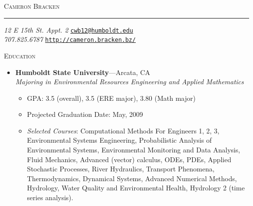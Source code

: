 \documentclass[11pt,oneside]{article}
\newcommand{\name}{Cameron Bracken}
\newcommand{\addr}{12 E 15th St. Appt. 2}
\newcommand{\phone}{707.825.6787}
\newcommand{\bigname}[1]{
	\begin{center}\Huge\scshape#1\end{center}
}
\newenvironment{ressection}[1]{
	\vspace{3pt}
	{\Large#1}
	\begin{itemize}
	\vspace{2pt}
}{
	\end{itemize}
}
\newcommand{\resitem}[1]{
	\vspace{-4pt}
	\item \begin{flushleft} #1 \end{flushleft}
}
\newcommand{\ressubitem}[1]{
	\vspace{-1pt}
	\item \begin{flushleft} #1 \end{flushleft}
}
\newcommand{\resbigitem}[3]{
	\vspace{-5pt}
	\item
	\textbf{#1}---#2 \\
	\textit{#3}
}
\newenvironment{ressubsec}[3]{
	\resbigitem{#1}{#2}{#3}
	\vspace{-2pt}
	\begin{itemize}
}{
	\end{itemize}
}
\begin{document}

\bigname{\name}

\vspace{-8pt} \rule{\textwidth}{1pt}

\vspace{-1pt} {\small \textit{\addr} \hfill \href{mailto:cwb12@humboldt.edu}{\texttt{cwb12@humboldt.edu}}}\\
\vspace{-1pt} {\small\textit{\phone} \hfill \href{http://cbracken.info/}{\texttt{http://cameron.bracken.bz/}}}


\vspace{8 pt}


    
    
    


\begin{ressection}{\scshape Education}

	\begin{ressubsec}{Humboldt State University}{Arcata, CA}{Majoring in Environmental Resources Engineering and Applied Mathematics}
		\ressubitem{GPA: 3.5 (overall), 3.5 (ERE major), 3.80 (Math major)}
		\ressubitem{Projected Graduation Date: May, 2009}
		\ressubitem{\begin{normalsize}\textit{Selected Courses}: Computational Methods For Engineers 1, 2, 3,
Environmental Systems Engineering, 
Probabilistic Analysis of Environmental Systems, 
Environmental Monitoring and Data Analysis, 
Fluid Mechanics, 
Advanced (vector) calculus, 
ODEs, 
PDEs, 
Applied Stochastic Processes,
River Hydraulics, 
Transport Phenomena, 
Thermodynamics, 
Dynamical Systems, 
Advanced Numerical Methods, 
Hydrology, 
Water Quality and Environmental Health,
Hydrology 2 (time series analysis).
\end{normalsize}}
	\end{ressubsec}

\end{ressection}
\end{document}
